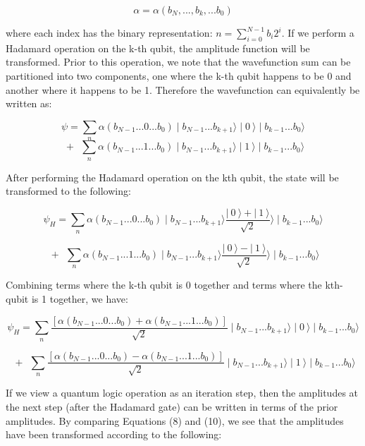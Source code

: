 \documentclass[reqno]{amsart}
\theoremstyle{definition}
\theoremstyle{remark}
\begin{document}
\begin{equation}
\alpha=\alpha(b_{N}, ... ,b_{k}, ...b_{0})
\end{equation}


\noindent
where each index has the binary representation: $n = \sum_{i=0}^{N-1} b_{i} 2^{i}$.
If we perform a Hadamard operation on the k-th qubit, the amplitude function will be transformed. Prior to this operation, we note that the wavefunction sum can be partitioned into two components, one where the k-th qubit happens to be 0 and another where it happens to be 1. 
Therefore the wavefunction can equivalently be written as:

\begin{equation}
\psi=\sum_{n} \alpha(b_{N-1}...0...b_{0})\mid b_{N-1}...b_{k+1}\rangle\mid0\:\rangle\mid b_{k-1}...b_{0}\rangle 
\end{equation}
$$
\: + \:\:\sum_{n} \alpha(b_{N-1}...1...b_{0})\mid b_{N-1}...b_{k+1}\rangle\mid1\:\rangle\mid b_{k-1}...b_{0}\rangle
$$

\noindent
After performing the Hadamard operation on the kth qubit, the state will be transformed to the following:

\begin{equation}
\psi_H=\sum_{n} \alpha(b_{N-1}...0...b_{0})\mid b_{N-1}...b_{k+1}\rangle\frac{|\:0\:\rangle+|\:1\:\rangle}{\sqrt{2}}\rangle\mid b_{k-1}...b_{0}\rangle 
\end{equation}

$$
\: + \:\:\sum_{n} \alpha(b_{N-1}...1...b_{0})\mid b_{N-1}...b_{k+1}\rangle\frac{|\:0\:\rangle-|\:1\:\rangle}{\sqrt{2}}\rangle\mid b_{k-1}...b_{0}\rangle
$$

\noindent
Combining terms where the k-th qubit is 0 together and terms where the kth-qubit is 1 together, we have:

\begin{equation}
\psi_H=\sum_{n} \frac{[\alpha(b_{N-1}...0...b_{0})+ \alpha(b_{N-1}...1...b_{0})]}{\sqrt{2}}\mid b_{N-1}...b_{k+1}\rangle\mid0\:\rangle\mid b_{k-1}...b_{0}\rangle
\end{equation}

$$
\: + \:\:\sum_{n} \frac{ [\alpha(b_{N-1}...0...b_{0})- \alpha(b_{N-1}...1...b_{0})]}{\sqrt{2}}\mid b_{N-1}...b_{k+1}\rangle\mid1\:\rangle\mid b_{k-1}...b_{0}\rangle
$$

\noindent
If we view a quantum logic operation as an iteration step, then the amplitudes at the next step (after the Hadamard gate) can be written in terms of the prior amplitudes. By comparing Equations (8) and (10), we see that the amplitudes have been transformed according to the following:
\end{document}
